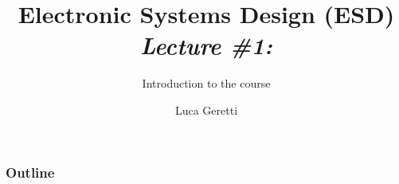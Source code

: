 \documentclass{beamer}
\title[ESD \#1]{Electronic Systems Design (ESD) \\ {\em Lecture \#1:}}
\subtitle{Introduction to the course}
\author{Luca Geretti}
\date{}
\institute{\uppercase{Università degli Studi di Udine}\\\url{luca.geretti@uniud.it}\\\url{https://bitbucket.org/uniud_esd/course}}
\begin{document}
\begin{frame}[plain,t]
\titlepage
\end{frame}

\begin{frame}%
	\frametitle{Outline}
\tableofcontents
\end{frame}


\end{document}
